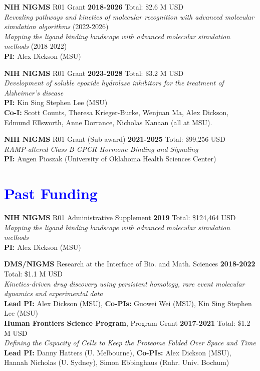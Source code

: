 \documentclass[margin,line]{res}
\begin{document}
\begin{resume}
{\bf NIH NIGMS} R01 Grant \hfill {\bf 2018-2026} Total: \$2.6 M USD \\
\emph{Revealing pathways and kinetics of molecular recognition with advanced molecular simulation algorithms} (2022-2026)\\
\emph{Mapping the ligand binding landscape with advanced molecular simulation methods} (2018-2022)\\
{\bf PI:} Alex Dickson (MSU)

{\bf NIH NIGMS} R01 Grant \hfill {\bf 2023-2028} Total: \$3.2 M USD \\
\emph{Development of soluble epoxide hydrolase inhibitors for the treatment of Alzheimer's disease} \\
     {\bf PI:} Kin Sing Stephen Lee (MSU) \\
     {\bf Co-I:} Scott Counts, Theresa Krieger-Burke, Wenjuan Ma, Alex Dickson, Edmund Ellsworth, Anne Dorrance, Nicholas Kanaan (all at MSU).

{\bf NIH NIGMS} R01 Grant (Sub-award) \hfill {\bf 2021-2025} Total: \$99,256 USD \\
\emph{RAMP‐altered Class B GPCR Hormone Binding and Signaling}\\
{\bf PI:} Augen Pioszak (University of Oklahoma Health Sciences Center)

\section{\sc \textcolor{blue}{Past Funding} }

{\bf NIH NIGMS} R01 Administrative Supplement \hfill {\bf 2019} Total: \$124,464 USD \\
\emph{Mapping the ligand binding landscape with advanced molecular simulation methods}\\
{\bf PI:} Alex Dickson (MSU)

{\bf DMS/NIGMS} Research at the Interface of Bio. and Math. Sciences \hfill {\bf 2018-2022} Total: \$1.1 M USD \\
 \emph{Kinetics-driven drug discovery using persistent homology, rare event molecular dynamics and experimental data}\\
 {\bf Lead PI:} Alex Dickson (MSU), {\bf Co-PIs:} Guowei Wei (MSU), Kin Sing Stephen Lee (MSU)\\

{\bf Human Frontiers Science Program}, Program Grant \hfill {\bf 2017-2021} Total: \$1.2 M USD \\
 \emph{Defining the Capacity of Cells to Keep the Proteome Folded Over Space and Time}\\
 {\bf Lead PI:} Danny Hatters (U. Melbourne), {\bf Co-PIs:} Alex Dickson (MSU), Hannah Nicholas (U. Sydney), Simon Ebbinghaus (Ruhr. Univ. Bochum) \\


\end{resume}
\end{document}
